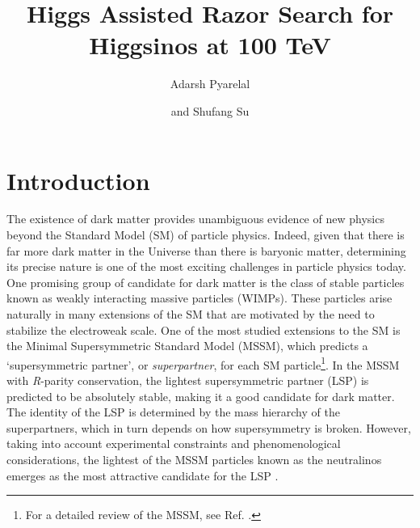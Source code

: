 \documentclass[a4paper,11pt]{article}
\title{Higgs Assisted Razor Search for Higgsinos at 100 TeV}
\author[a]{Adarsh Pyarelal}
\author[b]{and Shufang Su}
\affiliation[a]{School of Information, University of Arizona, Tucson, AZ 85718 , USA}
\affiliation[b]{Department of Physics, University of Arizona, Tucson, AZ 85718, USA}
\begin{document}
 
\maketitle
\flushbottom

\section{Introduction}
 
The existence of dark matter provides unambiguous evidence of new 
physics beyond the Standard Model (SM) of particle physics. Indeed, 
given that there is far more dark matter in the Universe than there 
is baryonic matter, determining its precise nature is one of the most 
exciting challenges in particle physics today.  One promising group 
of candidate for dark matter is the class of stable particles known as 
weakly interacting massive particles (WIMPs). These particles arise 
naturally in many extensions of the SM that are motivated by the need to
stabilize the electroweak scale. One of the most studied extensions
to the SM is the Minimal Supersymmetric Standard Model
(MSSM), which predicts a `supersymmetric partner', or \emph{superpartner}, 
for each SM particle\footnote{For a detailed review of the MSSM, see 
Ref. \citep{Martin:1997ns}.}. In the MSSM with \emph{R}-parity conservation, the 
lightest supersymmetric partner (LSP) is predicted to be absolutely 
stable, making it a good candidate for dark matter. The identity of 
the LSP is determined by the mass hierarchy of the superpartners, 
which in turn depends on how supersymmetry is broken.
However, taking into account experimental constraints and phenomenological 
considerations, the lightest of the  MSSM particles known as the 
neutralinos emerges as the most attractive candidate for the LSP \citep{Bertone:2004pz}. 
\end{document}
